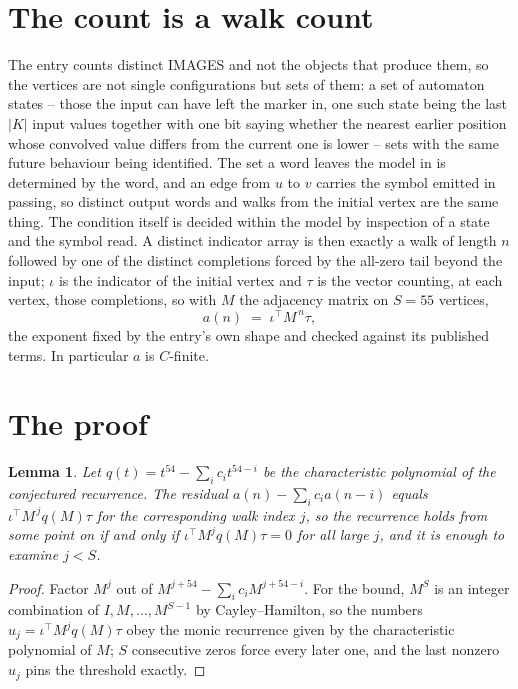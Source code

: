\documentclass[11pt,a4paper]{article}
\theoremstyle{plain}
\newtheorem{lemma}[theorem]{Lemma}
\theoremstyle{definition}
\begin{document}
\section{The count is a walk count}

The entry counts distinct IMAGES and not the objects that produce them, so the vertices are not single configurations but sets of them: a set of automaton states -- those the input can have left the marker in, one such state being the last $|K|$ input values together with one bit saying whether the nearest earlier position whose convolved value differs from the current one is lower -- sets with the same future behaviour being identified. The set a word leaves the model in is determined by the word, and an edge from $u$ to $v$ carries the symbol emitted in passing, so distinct output words and walks from the initial vertex are the same thing. The condition itself is decided within the model by inspection of a state and the symbol read.
A distinct indicator array is then exactly a walk of length $n$ followed by one of the distinct completions forced by the all-zero tail beyond the input; $\iota$ is the indicator of the initial vertex and $\tau$ is the vector counting, at each vertex, those completions, so with $M$ the adjacency matrix on $S=55$ vertices,
\[
a(n)\;=\;\iota^{\!\top}M^{\,n}\tau ,
\]
the exponent fixed by the entry's own shape and checked against its published terms. In
particular $a$ is $C$-finite.

\section{The proof}

\begin{lemma}\label{lem:crit}
Let $q(t)=t^{54}-\sum_i c_it^{54-i}$ be the characteristic polynomial of the
conjectured recurrence. The residual $a(n)-\sum_ic_ia(n-i)$ equals
$\iota^{\!\top}M^{\,j}q(M)\tau$ for the corresponding walk index $j$, so the recurrence
holds from some point on if and only if $\iota^{\!\top}M^{j}q(M)\tau=0$ for all large $j$,
and it is enough to examine $j<S$.
\end{lemma}

\begin{proof}
Factor $M^{j}$ out of $M^{j+54}-\sum_ic_iM^{j+54-i}$. For the bound, $M^{S}$
is an integer combination of $I,M,\dots,M^{S-1}$ by Cayley--Hamilton, so the numbers
$u_j=\iota^{\!\top}M^{j}q(M)\tau$ obey the monic recurrence given by the characteristic
polynomial of $M$; $S$ consecutive zeros force every later one, and the last nonzero $u_j$
pins the threshold exactly.
\end{proof}
\end{document}
